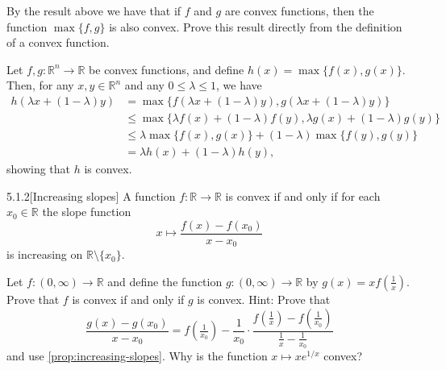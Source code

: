 \documentclass[
  a4paper,
  12pt,
]{article}
\numberwithin{equation}{section}
\begin{document}
\setcounter{section}{5}

\begin{exercise}
  By the result above we have that if $f$ and $g$ are convex functions, then the function $\max\{f,g\}$ is also convex.
  Prove this result directly from the definition of a convex function.
\end{exercise}

\begin{solution}
  Let $f, g : \mathbb{R}^n \to \mathbb{R}$ be convex functions, and define $h(x) = \max\{f(x), g(x)\}$.
  Then, for any $x, y \in \mathbb{R}^n$ and any $0 \leq \lambda \leq 1$, we have
  \begin{align*}
    h(\lambda x + (1 - \lambda) y)
    &= \max\{f(\lambda x + (1 - \lambda) y), g(\lambda x + (1 - \lambda) y)\} \\
    &\leq \max\{\lambda f(x) + (1 - \lambda) f(y), \lambda g(x) + (1 - \lambda) g(y)\} \\
    &\leq \lambda \max\{f(x), g(x)\} + (1 - \lambda) \max\{f(y), g(y)\} \\
    &= \lambda h(x) + (1 - \lambda) h(y),
  \end{align*}
  showing that $h$ is convex.
\end{solution}


\begin{manualprop}{5.1.2}[Increasing slopes]\label{prop:increasing-slopes}
  A function $f : \mathbb{R} \to \mathbb{R}$ is convex if and only if for each $x_0 \in \mathbb{R}$ the slope function
  \begin{equation}
    x \mapsto \frac{f(x)-f(x_0)}{x-x_0}
  \end{equation}
  is increasing on $\mathbb{R} \setminus \{x_0\}$.
\end{manualprop}

\begin{exercise}
  Let $f : (0, \infty) \to \mathbb{R}$ and define the function $g : (0, \infty) \to \mathbb{R}$ by $g(x) = x f(\frac{1}{x})$.
  Prove that $f$ is convex if and only if $g$ is convex.
  Hint: Prove that
  \begin{equation}
    \frac{g(x) - g(x_0)}{x - x_0} = f(\tfrac{1}{x_0}) - \frac{1}{x_0} \cdot \frac{f(\frac{1}{x}) - f(\frac{1}{x_0})}{\frac{1}{x} - \frac{1}{x_0}}
    \label{eq:exercise522-hint}
  \end{equation}
  and use \cref{prop:increasing-slopes}.
  Why is the function $x \mapsto x e^{1/x}$ convex?
\end{exercise}
\end{document}
